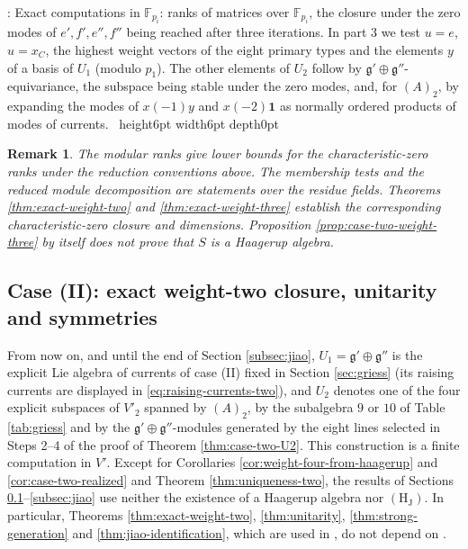 \documentclass[leqno]{article}
\newcommand{\qed}{\hfill \vrule height6pt  width6pt depth0pt}
\newtheorem{remark}[thm]{Remark}
\newenvironment{proof}[1][]{\noindent {\it Proof #1} : }{\hbox{~}\qed
\smallskip
}
\numberwithin{equation}{section}
\begin{document}
\begin{proof}
Exact computations in $\mathbb F_{p_i}$: ranks of matrices over $\mathbb F_{p_i}$, the closure under the zero modes of $e',f',e'',f''$ being reached after three iterations. In part 3 we test $u = e$, $u = x_C$, the highest weight vectors of the eight primary types and the elements $y$ of a basis of $U_1$ (modulo $p_1$). The other elements of $U_2$ follow by $\mathfrak g' \oplus \mathfrak g''$-equivariance, the subspace being stable under the zero modes, and, for $(A)_2$, by expanding the modes of $x(-1)y$ and $x(-2)\mathbf 1$ as normally ordered products of modes of currents.
\end{proof}

\begin{remark}\normalfont
\label{rem:weight-three-meaning}
The modular ranks give lower bounds for the characteristic-zero ranks under the reduction conventions above. The membership tests and the reduced module decomposition are statements over the residue fields. Theorems \ref{thm:exact-weight-two} and \ref{thm:exact-weight-three} establish the corresponding characteristic-zero closure and dimensions. Proposition \ref{prop:case-two-weight-three} by itself does not prove that $S$ is a Haagerup algebra.
\end{remark}


\subsection{Case (II): exact weight-two closure, unitarity and symmetries}
\label{subsec:case-two-exact}

From now on, and until the end of Section \ref{subsec:jiao}, $U_1 = \mathfrak g' \oplus \mathfrak g''$ is the explicit Lie algebra of currents of case (II) fixed in Section \ref{sec:griess} (its raising currents are displayed in \eqref{eq:raising-currents-two}), and $U_2$ denotes one of the four explicit subspaces of $V'_2$ spanned by $(A)_2$, by the subalgebra $9$ or $10$ of Table \ref{tab:griess} and by the $\mathfrak g' \oplus \mathfrak g''$-modules generated by the eight lines selected in Steps 2--4 of the proof of Theorem \ref{thm:case-two-U2}. This construction is a finite computation in $V'$. Except for Corollaries \ref{cor:weight-four-from-haagerup} and \ref{cor:case-two-realized} and Theorem \ref{thm:uniqueness-two}, the results of Sections \ref{subsec:case-two-exact}--\ref{subsec:jiao} use neither the existence of a Haagerup algebra nor $\mathrm{(H_J)}$. In particular, Theorems \ref{thm:exact-weight-two}, \ref{thm:unitarity}, \ref{thm:strong-generation} and \ref{thm:jiao-identification}, which are used in \cite{ArhIII}, do not depend on \cite{ArhIII}.
\end{document}
